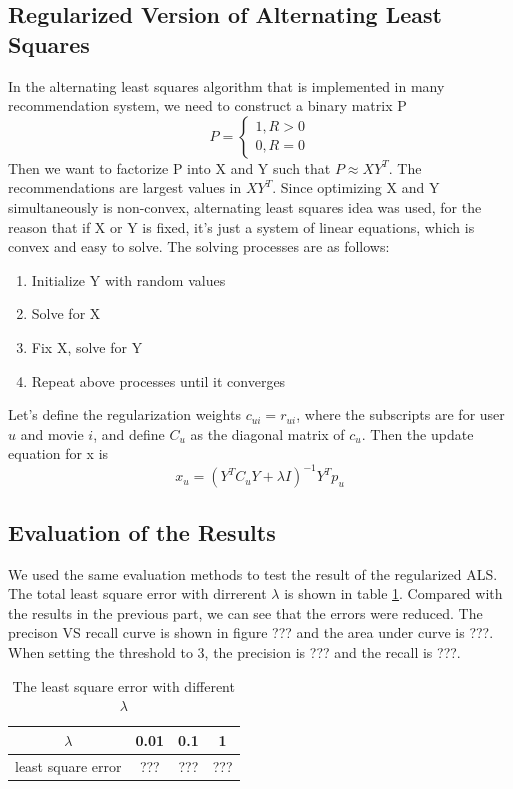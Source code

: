 \documentclass{article}
\begin{document}
\subsection{Regularized Version of Alternating Least Squares}
In the alternating least squares algorithm that is implemented in many recommendation system, we need to construct a binary matrix P
\begin{equation*}
P = \begin{cases}
				1, R > 0\\
				0, R = 0
		\end{cases}
\end{equation*}
Then we want to factorize P into X and Y such that $P \approx XY^T$. The recommendations are largest values in $XY^T$. Since optimizing X and Y simultaneously is non-convex, alternating least squares idea was used, for the reason that if X or Y is fixed, it's just a system of linear equations, which is convex and easy to solve. The solving processes are as follows:
\begin{enumerate}
\item Initialize Y with random values
\item Solve for X
\item Fix X, solve for Y
\item Repeat above processes until it converges
\end{enumerate}
Let's define the regularization weights $c_{ui} = r_{ui}$, where the subscripts are for user $u$ and movie $i$, and define $C_u$ as the diagonal matrix of $c_u$. Then the update equation for x is
\begin{equation*}
x_u = (Y^TC_uY+\lambda I)^{-1}Y^Tp_u
\end{equation*}
\subsection{Evaluation of the Results}
We used the same evaluation methods to test the result of the regularized ALS. The total least square error with dirrerent $\lambda$ is shown in table \ref{tb:lamda}. Compared with the results in the previous part, we can see that the errors were reduced. The precison VS recall curve is shown in figure ??? and the area under curve is ???. When setting the threshold to 3, the precision is ??? and the recall is ???.
\begin{table}
\begin{center}
\caption{The least square error with different $\lambda$}
\label{tb:lamda}
\begin{tabular}{|c|c|c|c|}
\hline
$\lambda$& 0.01& 0.1 & 1\\
\hline
least square error&???&???&???\\
\hline
\end{tabular}
\end{center}
\end{table}
\end{document}
